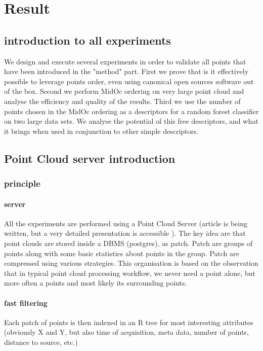 

 \section{\label{sec:result}Result}
 	\subsection{introduction to all experiments}
 		We design and execute several experiments in order to validate all points that have been introduced in the "method" part.
 		First we prove that is it effectively possible to leverage points order, even using canonical open sources software out of the box.
 		Second we perform MidOc ordering on very large point cloud and analyse the efficiency and quality of the results.
 		Third we use the number of points chosen in the MidOc ordering as a descriptors for a random forest classifier on two large data sets.
 		We analyse the potential of this free descriptors, and what it brings when used in conjunction to other simple descriptors.
	\subsection{Point Cloud server introduction}
		\subsubsection{principle}
			\paragraph{server}
				All the experiments are performed using a Point Cloud Server (article is being written, but a very detailed presentation is accessible ).
				The key idea are that point clouds are stored inside a DBMS (postgres), as patch. Patch are groups of points along with some basic statistics about points in the group. Patch are compressed using various strategies.
				This organisation is based on the observation that in typical point cloud processing workflow, we never need a point alone, but more often a points and most likely its surrounding points.
			
			\paragraph{fast filtering}
				Each patch of points is then indexed in an R tree for most interesting attributes (obviously X and Y, but also time of acquisition, meta data, number of points, distance to source, etc.)
				
